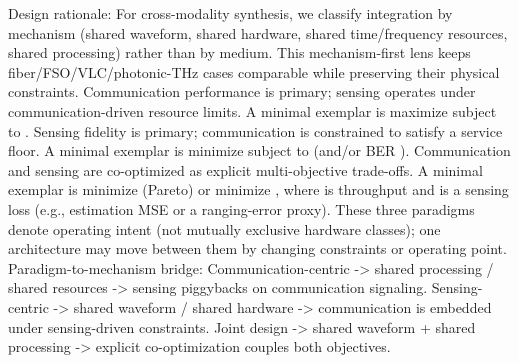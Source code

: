 {}
\markdownRendererSectionEnd \markdownRendererSectionBegin
{}\markdownRendererInterblockSeparator
{}Design rationale: For cross-modality synthesis, we classify integration by mechanism (shared waveform, shared hardware, shared time/frequency resources, shared processing) rather than by medium. This mechanism-first lens keeps fiber/FSO/VLC/photonic-THz cases comparable while preserving their physical constraints.\markdownRendererParagraphSeparator
{} Communication performance is primary; sensing operates under communication-driven resource limits. A minimal exemplar is maximize  subject to .\markdownRendererParagraphSeparator
{} Sensing fidelity is primary; communication is constrained to satisfy a service floor. A minimal exemplar is minimize  subject to  (and/or BER \markdownRendererInlineMath{\le \beta}).\markdownRendererParagraphSeparator
{} Communication and sensing are co-optimized as explicit multi-objective trade-offs. A minimal exemplar is minimize  (Pareto) or minimize , where  is throughput and  is a sensing loss (e.g., estimation MSE or a ranging-error proxy).\markdownRendererParagraphSeparator
{}These three paradigms denote operating intent (not mutually exclusive hardware classes); one architecture may move between them by changing constraints or operating point.\markdownRendererParagraphSeparator
{}Paradigm-to-mechanism bridge:\markdownRendererInterblockSeparator
{}\markdownRendererUlBeginTight
\markdownRendererUlItem Communication-centric -> shared processing / shared resources -> sensing piggybacks on communication signaling.\markdownRendererUlItemEnd 
\markdownRendererUlItem Sensing-centric -> shared waveform / shared hardware -> communication is embedded under sensing-driven constraints.\markdownRendererUlItemEnd 
\markdownRendererUlItem Joint design -> shared waveform + shared processing -> explicit co-optimization couples both objectives.\markdownRendererUlItemEnd 
